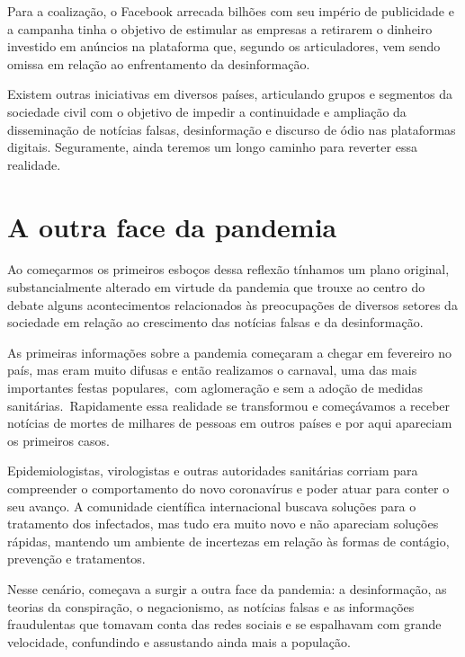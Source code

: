 Para a coalização, o Facebook arrecada bilhões com seu império de
publicidade e a campanha tinha o objetivo de estimular as empresas a
retirarem o dinheiro investido em anúncios na plataforma que, segundo os
articuladores, vem sendo omissa em relação ao enfrentamento da
desinformação.

Existem outras iniciativas em diversos países, articulando grupos e
segmentos da sociedade civil com o objetivo de impedir a continuidade e
ampliação da disseminação de notícias falsas, desinformação e discurso
de ódio nas plataformas digitais. Seguramente, ainda teremos um longo
caminho para reverter essa realidade.

\chapter{A outra face da pandemia}

Ao começarmos os primeiros esboços dessa reflexão tínhamos um plano
original, substancialmente alterado em virtude da pandemia que trouxe ao
centro do debate alguns acontecimentos relacionados às preocupações de
diversos setores da sociedade em relação ao crescimento das notícias
falsas e da desinformação.

As primeiras informações sobre a pandemia começaram a chegar em
fevereiro no país, mas eram muito difusas e então realizamos o carnaval,
uma das mais importantes festas populares,~com aglomeração e sem a
adoção de medidas sanitárias.~Rapidamente essa realidade se transformou
e começávamos a receber notícias de mortes de milhares de pessoas em
outros países e por aqui apareciam os primeiros casos.

Epidemiologistas, virologistas e outras autoridades sanitárias corriam
para compreender o comportamento do novo coronavírus e poder atuar para
conter o seu avanço. A comunidade científica internacional buscava
soluções para o tratamento dos infectados, mas tudo era muito novo e não
apareciam soluções rápidas, mantendo um ambiente de incertezas em
relação às formas de contágio, prevenção e tratamentos.

Nesse cenário, começava a surgir a outra face da pandemia: a
desinformação, as teorias da conspiração, o negacionismo, as notícias
falsas e as informações fraudulentas que tomavam conta das redes sociais
e se espalhavam com grande velocidade, confundindo e assustando ainda
mais a população.

